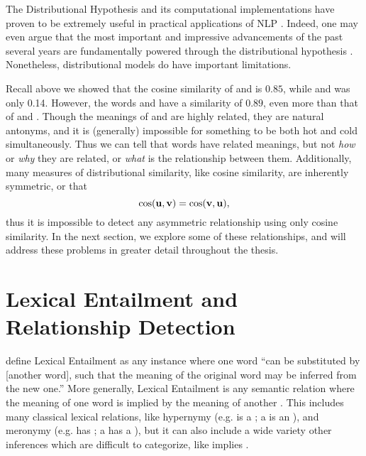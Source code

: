 The Distributional Hypothesis and its computational implementations have proven
to be extremely useful in practical applications of NLP \cite{cho:2015:arxiv,goldberg:2016:jair}. Indeed,
one may even argue that the most important and impressive advancements of
the past several years are fundamentally powered through the distributional
hypothesis \cite{manning:2015:cl}. Nonetheless, distributional models do have
important limitations.

Recall above we showed that the cosine similarity of  and
 is $0.85$, while  and  was only 0.14.
However,  the words  and  have a similarity of $0.89$, even
more than that of  and . Though the meanings of
 and  are highly related, they are natural antonyms, and it
is (generally) impossible for something to be both hot and cold simultaneously.
Thus we can tell that words have related meanings, but not {\em how} or {\em
why} they are related, or {\em what} is the relationship between them.
Additionally, many measures of distributional similarity, like cosine similarity,
are inherently symmetric, or that
\begin{equation*}
  \text{cos}({\mathbf{u}}, {\mathbf{v}}) = \text{cos}({\mathbf{v}}, {\mathbf{u}}),
\end{equation*}
thus it is impossible to detect any asymmetric relationship using only cosine
similarity. In the next section, we explore some of these relationships, and
will address these problems in greater detail throughout the thesis.

\section{Lexical Entailment and Relationship Detection}

 define Lexical Entailment as any instance
where one word ``can be substituted by [another word], such that the meaning of
the original word may be inferred from the new one.'' More generally,
Lexical Entailment is any semantic relation where
the meaning of one word is implied by the meaning of another
\cite{shnarch:2008:thesis}.
This includes many classical lexical relations, like hypernymy
(e.g.  is a ; a  is an ), and meronymy
(e.g.  has ; a  has a ), but it can also include a
wide variety other inferences which are difficult to categorize,
like  implies . 

